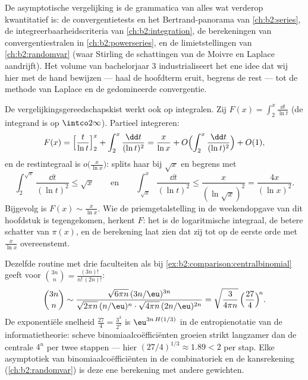 \begin{remark}
De asymptotische vergelijking is de grammatica van alles wat
verderop kwantitatief is: de convergentietests en het
Bertrand-panorama van \cref{ch:b2:series}, de
integreerbaarheidscriteria van \cref{ch:b2:integration}, de
berekeningen van convergentiestralen in
\cref{ch:b2:powerseries}, en de limietstellingen van
\cref{ch:b2:randomvar} (waar Stirling de schattingen van de
Moivre en Laplace aandrijft). Het volume van bachelorjaar 3
industrialiseert het ene idee dat wij hier met de hand bewijzen
--- haal de hoofdterm eruit, begrens de rest --- tot de methode
van Laplace en de gedomineerde convergentie.
\end{remark}

\begin{example}\label{ex:b2:comparison:liworked}
De vergelijkingsgereedschapskist werkt ook op integralen. Zij
$F(x) = \int_2^x\frac{\dd t}{\ln t}$ (de integrand is  op
$\intco2\infty$). Partieel integreren:
\[
F(x) = \Bigl[\frac{t}{\ln t}\Bigr]_2^x +
\int_2^x\frac{\dd t}{(\ln t)^2}
= \frac{x}{\ln x} + O\Bigl(\int_2^x\frac{\dd t}{(\ln
t)^2}\Bigr) + O(1),
\]
en de restintegraal is $o\bigl(\frac{x}{\ln x}\bigr)$: splits haar
bij $\sqrt x$ en begrens met
\[
\int_2^{\sqrt x}\frac{\dd t}{(\ln t)^2} \leq \sqrt x
\qquad\text{en}\qquad
\int_{\sqrt x}^{x}\frac{\dd t}{(\ln t)^2} \leq
\frac{x}{(\ln\sqrt x)^2} = \frac{4x}{(\ln x)^2} .
\]
Bijgevolg is $F(x) \sim \frac{x}{\ln x}$. Wie de priemgetalstelling
in de weekendopgave van dit hoofdstuk is tegengekomen, herkent
$F$: het is de logaritmische integraal, de betere schatter van
$\pi(x)$, en de berekening laat zien dat zij tot op de eerste orde
met $\frac{x}{\ln x}$ overeenstemt.
\end{example}

\begin{example}\label{ex:b2:comparison:lopsided}
Dezelfde routine met drie faculteiten als bij
\cref{ex:b2:comparison:centralbinomial} geeft voor
$\binom{3n}{n} = \frac{(3n)!}{n!\,(2n)!}$:
\[
\binom{3n}{n} \sim
\frac{\sqrt{6\pi n}\,(3n/\eu)^{3n}}
{\sqrt{2\pi n}\,(n/\eu)^{n}\cdot\sqrt{4\pi n}\,(2n/\eu)^{2n}}
= \sqrt{\frac{3}{4\pi n}}\,
\Bigl(\frac{27}{4}\Bigr)^{\!n} .
\]
De exponentiële snelheid $\frac{27}4 = \frac{3^3}{2^2}$ is
$\eu^{3n\,H(1/3)}$ in de entropienotatie van de informatietheorie:
scheve binomiaalcoëfficiënten groeien strikt langzamer dan de
centrale $4^n$ per twee stappen --- hier $(27/4)^{1/3} \approx
1.89 < 2$ per stap. Elke asymptotiek van binomiaalcoëfficiënten in
de combinatoriek en de kansrekening (\cref{ch:b2:randomvar}) is
deze ene berekening met andere gewichten.
\end{example}

